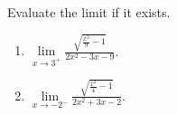 Evaluate the limit if it exists.
\begin{enumerate}[ref={\fcProblemRef}]
\item \label{problemlimxto3+sqrt(x^2/9-1)/(2x^2-3x-9)} $\displaystyle \lim\limits_{x\to 3^+} \frac{ \sqrt{ \frac{x^2 }{9} - 1 }}{2x^2 -3x-9 }$. 

\item $\displaystyle \lim\limits_{x\to -2^-} \frac{\sqrt{ \frac{ x^2}{ 4}-1 }}{2x^2 +3x-2 }$. 
\end{enumerate}
